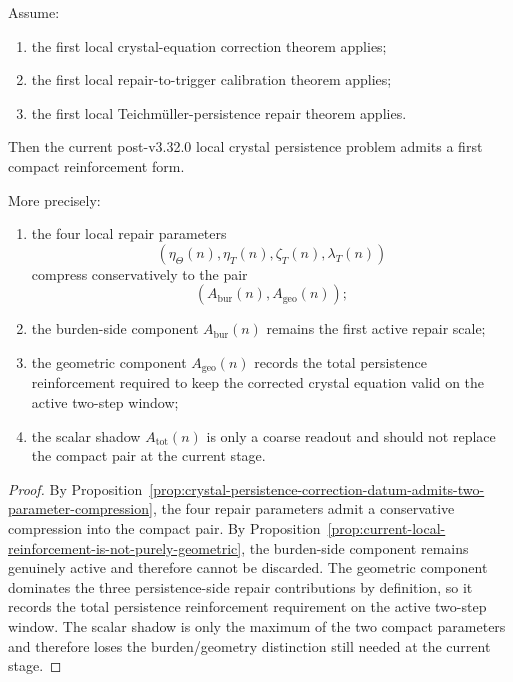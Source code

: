 \begin{theorem}
\label{thm:first-compact-reinforcement-theorem}
Assume:
\begin{enumerate}[leftmargin=2em,label=(\alph*)]
  \item the first local crystal-equation correction theorem applies;
  \item the first local repair-to-trigger calibration theorem applies;
  \item the first local Teichmüller-persistence repair theorem applies.
\end{enumerate}
Then the current post-v3.32.0 local crystal persistence problem admits a first compact reinforcement form.

More precisely:
\begin{enumerate}[leftmargin=2em,label=(\arabic*)]
  \item the four local repair parameters
  \[
    (\eta_{\Theta}(n),\eta_T(n),\zeta_T(n),\lambda_T(n))
  \]
  compress conservatively to the pair
  \[
    (A_{\mathrm{bur}}(n),A_{\mathrm{geo}}(n));
  \]
  \item the burden-side component $A_{\mathrm{bur}}(n)$ remains the first active repair scale;
  \item the geometric component $A_{\mathrm{geo}}(n)$ records the total persistence reinforcement required to keep the corrected crystal equation valid on the active two-step window;
  \item the scalar shadow $A_{\mathrm{tot}}(n)$ is only a coarse readout and should not replace the compact pair at the current stage.
\end{enumerate}
\end{theorem}

\begin{proof}
By Proposition~\ref{prop:crystal-persistence-correction-datum-admits-two-parameter-compression}, the four repair parameters admit a conservative compression into the compact pair.
By Proposition~\ref{prop:current-local-reinforcement-is-not-purely-geometric}, the burden-side component remains genuinely active and therefore cannot be discarded.
The geometric component dominates the three persistence-side repair contributions by definition, so it records the total persistence reinforcement requirement on the active two-step window.
The scalar shadow is only the maximum of the two compact parameters and therefore loses the burden/geometry distinction still needed at the current stage.
\end{proof}

